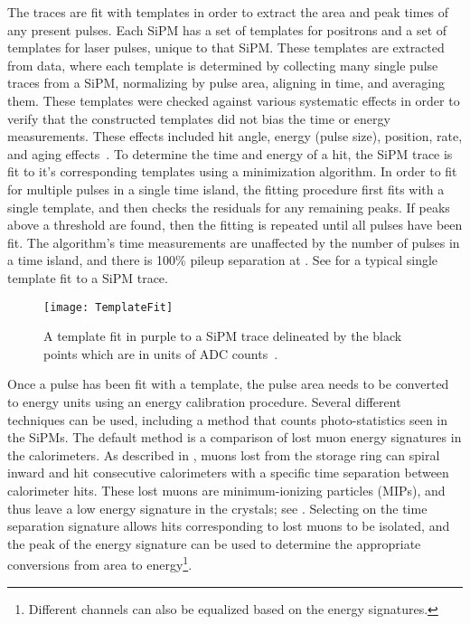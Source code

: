 The traces are fit with templates in order to extract the area and peak times of any present pulses. Each SiPM has a set of templates for positrons and a set of templates for laser pulses, unique to that SiPM. These templates are extracted from data, where each template is determined by collecting many single pulse traces from a SiPM, normalizing by pulse area, aligning in time, and averaging them. These templates were checked against various systematic effects in order to verify that the constructed templates did not bias the time or energy measurements. These effects included hit angle, energy (pulse size), position, rate, and aging effects~\cite{Kaspar:2016ofv,AFThesis}. To determine the time and energy of a hit, the SiPM trace is fit to it's corresponding templates using a \chisq minimization algorithm. In order to fit for multiple pulses in a single time island, the fitting procedure first fits with a single template, and then checks the residuals for any remaining peaks. If peaks above a threshold are found, then the fitting is repeated until all pulses have been fit. The algorithm's time measurements are unaffected by the number of pulses in a time island, and there is 100\% pileup separation at . See  for a typical single template fit to a SiPM trace.


\begin{figure}
    \centering
    \texttt{[image: TemplateFit]}
    \caption[Template fit to SiPM trace]{A template fit in purple to a SiPM trace delineated by the black points which are in units of ADC counts~\cite{AFThesis}.}
    \label{fig:TemplateFit}
\end{figure}


Once a pulse has been fit with a template, the pulse area needs to be converted to energy units using an energy calibration procedure. Several different techniques can be used, including a method that counts photo-statistics seen in the SiPMs. The default method is a comparison of lost muon energy signatures in the calorimeters. As described in , muons lost from the storage ring can spiral inward and hit consecutive calorimeters with a specific time separation between calorimeter hits. These lost muons are minimum-ionizing particles (MIPs), and thus leave a low energy signature in the crystals; see . Selecting on the time separation signature allows hits corresponding to lost muons to be isolated, and the peak of the energy signature can be used to determine the appropriate conversions from area to energy\footnote{Different channels can also be equalized based on the energy signatures.}. 


